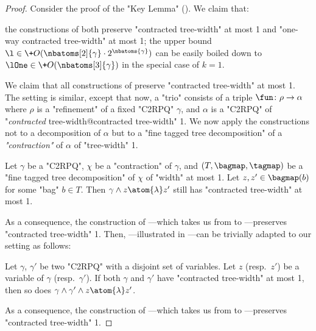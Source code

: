 \begin{proof}
	Consider the proof of the "Key Lemma" ().
	We claim that:
	\begin{enumerate}
		\itemAP the constructions of
			both preserve "contracted tree-width" at most 1 and "one-way contracted tree-width" at most 1;
			\label{eq:lemma:bound_size_refinements_tw:1}
		\itemAP the upper bound
			$\l \in \+O(\nbatoms[2]{\gamma} \cdot 2^{\nbatoms{\gamma}})$
			can be easily boiled down to $\lOne \in \+O(\nbatoms[3]{\gamma})$ in the special case of $k=1$.
			\label{eq:lemma:bound_size_refinements_tw:2}
	\end{enumerate}

	\smallskip

	We claim that all constructions of  preserve "contracted tree-width" 
	at most 1. The setting is similar, except that now, a "trio" consists of a triple $\fun\colon \rho \to 
	\alpha$ where $\rho$ is a "refinement" of a fixed "C2RPQ" $\gamma$, and $\alpha$ is a "C2RPQ" of
	"\emph{contracted} tree-width@contracted tree-width" 1. We now apply the constructions not to a decomposition of $\alpha$ but to a "fine tagged tree decomposition" of a \emph{"contraction"} of $\alpha$ of "tree-width" 1.
	
	\begin{fact}
		Let $\gamma$ be a "C2RPQ", $\chi$ be a "contraction" of $\gamma$, and
		$(T, \bagmap, \tagmap)$ be a "fine tagged tree decomposition" of $\chi$ of "width" at most 1.
		Let $z, z' \in \bagmap(b)$ for some "bag" $b \in T$. Then $\gamma \land z \atom{\lambda} z'$
		still has "contracted tree-width" at most 1.
	\end{fact}
	As a consequence, the construction of ---which takes us from  to ---preserves "contracted tree-width" 1.
	Then, ---illustrated in ---can be trivially adapted to our setting as follows:
	\begin{fact}
		Let $\gamma$, $\gamma'$ be two "C2RPQ" with a disjoint set of variables.
		Let $z$ (resp.\ $z'$) be a variable of $\gamma$ (resp.\ $\gamma'$).
		If both $\gamma$ and $\gamma'$ have "contracted tree-width" at most 1, then so does
		$\gamma \land \gamma' \land z \atom{\lambda} z'$.
	\end{fact}
	As a consequence, the construction of ---which takes us from 
	 to ---preserves "contracted tree-width" 1. 


\end{proof}
